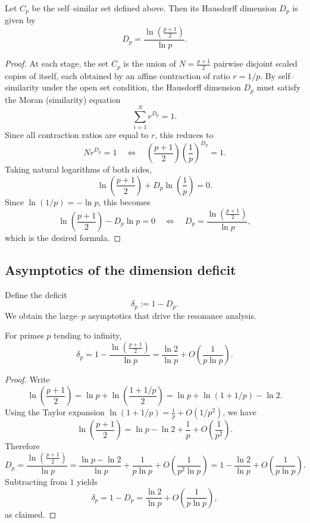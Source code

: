 \documentclass[11pt]{article}
\begin{document}
\begin{proposition}
Let \(C_p\) be the self–similar set defined above. Then its Hausdorff dimension \(D_p\) is given by
\[
  D_p = \frac{\ln\left(\frac{p+1}{2}\right)}{\ln p}.
\]
\end{proposition}

\begin{proof}
At each stage, the set \(C_p\) is the union of \(N = \frac{p+1}{2}\) pairwise disjoint scaled copies of itself, each obtained by an affine contraction of ratio \(r = 1/p\). By self–similarity under the open set condition, the Hausdorff dimension \(D_p\) must satisfy the Moran (similarity) equation
\[
  \sum_{i=1}^{N} r^{D_p} = 1.
\]
Since all contraction ratios are equal to \(r\), this reduces to
\[
  N r^{D_p} = 1
  \quad\Longleftrightarrow\quad
  \left(\frac{p+1}{2}\right)\left(\frac{1}{p}\right)^{D_p} = 1.
\]
Taking natural logarithms of both sides,
\[
  \ln\left(\frac{p+1}{2}\right) + D_p \ln\left(\frac{1}{p}\right) = 0.
\]
Since \(\ln(1/p) = -\ln p\), this becomes
\[
  \ln\left(\frac{p+1}{2}\right) - D_p \ln p = 0
  \quad\Longleftrightarrow\quad
  D_p = \frac{\ln\left(\frac{p+1}{2}\right)}{\ln p},
\]
which is the desired formula.
\end{proof}

\subsection{Asymptotics of the dimension deficit}

Define the deficit
\[
  \delta_p := 1 - D_p.
\]
We obtain the large–\(p\) asymptotics that drive the resonance analysis.

\begin{lemma}
For primes \(p\) tending to infinity,
\[
  \delta_p = 1 - \frac{\ln\left(\frac{p+1}{2}\right)}{\ln p}
  = \frac{\ln 2}{\ln p} + O\!\left(\frac{1}{p \ln p}\right).
\]
\end{lemma}

\begin{proof}
Write
\[
  \ln\left(\frac{p+1}{2}\right)
   = \ln p + \ln\left(\frac{1 + 1/p}{2}\right)
   = \ln p + \ln(1 + 1/p) - \ln 2.
\]
Using the Taylor expansion \(\ln(1 + 1/p) = \frac{1}{p} + O(1/p^2)\), we have
\[
  \ln\left(\frac{p+1}{2}\right)
  = \ln p - \ln 2 + \frac{1}{p} + O\!\left(\frac{1}{p^2}\right).
\]
Therefore
\[
  D_p = \frac{\ln\left(\frac{p+1}{2}\right)}{\ln p}
      = \frac{\ln p - \ln 2}{\ln p} + \frac{1}{p\ln p} + O\!\left(\frac{1}{p^2\ln p}\right)
      = 1 - \frac{\ln 2}{\ln p} + O\!\left(\frac{1}{p\ln p}\right).
\]
Subtracting from \(1\) yields
\[
  \delta_p = 1 - D_p = \frac{\ln 2}{\ln p} + O\!\left(\frac{1}{p\ln p}\right),
\]
as claimed.
\end{proof}
\end{document}
